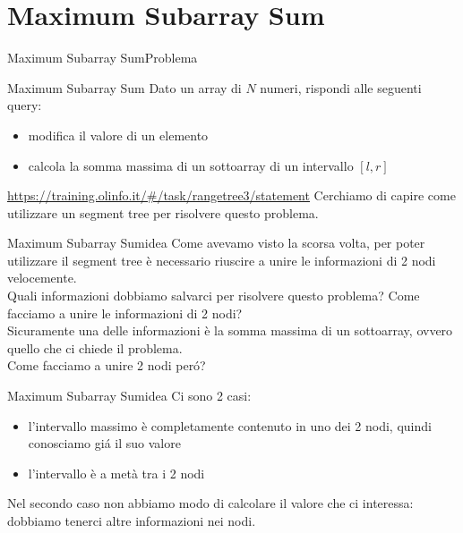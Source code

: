\documentclass[compress]{beamer}
\begin{document}
\section{Maximum Subarray Sum}
\begin{frame}{Maximum Subarray Sum}{Problema}
    \begin{exampleblock}{Maximum Subarray Sum}
        Dato un array di $N$ numeri, rispondi alle seguenti query:
        \begin{itemize}
            \item modifica il valore di un elemento
            \item calcola la somma massima di un sottoarray di un intervallo $[l, r]$
        \end{itemize}
    \end{exampleblock}
    \underline{\url{https://training.olinfo.it/\#/task/rangetree3/statement}}
    \pause
    Cerchiamo di capire come utilizzare un segment tree per risolvere questo problema.
\end{frame}

\begin{frame}{Maximum Subarray Sum}{idea}
    Come avevamo visto la scorsa volta, per poter utilizzare il segment tree è necessario riuscire a unire le informazioni di 2 nodi velocemente.\\
    \pause
    Quali informazioni dobbiamo salvarci per risolvere questo problema? Come facciamo a unire le informazioni di 2 nodi?\\
    \pause
    Sicuramente una delle informazioni è la somma massima di un sottoarray, ovvero quello che ci chiede il problema.\\
    \pause
    Come facciamo a unire 2 nodi per\'o?\\
\end{frame}

\begin{frame}{Maximum Subarray Sum}{idea}
    \vfill
    Ci sono 2 casi:
    \begin{itemize}
        \item l'intervallo massimo è completamente contenuto in uno dei 2 nodi, quindi conosciamo gi\'a il suo valore
        \item l'intervallo è a met\`a tra i 2 nodi
    \end{itemize}
    \pause
    Nel secondo caso non abbiamo modo di calcolare il valore che ci interessa: dobbiamo tenerci altre informazioni nei nodi.\\
\end{frame}
\end{document}
